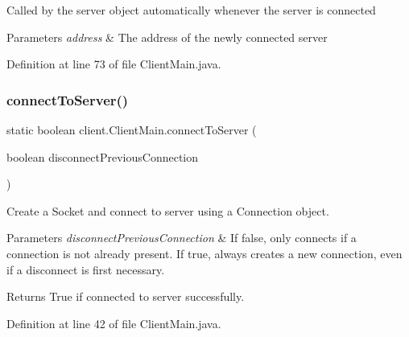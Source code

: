 Called by the {\ttfamily server} object automatically whenever the server is connected


\begin{DoxyParams}{Parameters}
{\em address} & The address of the newly connected server \\
\hline
\end{DoxyParams}


Definition at line 73 of file Client\+Main.\+java.

\hypertarget{classclient_1_1_client_main_aecd59c193bdb0536d649be78f72149b0}{}\label{classclient_1_1_client_main_aecd59c193bdb0536d649be78f72149b0} 
\subsubsection{\texorpdfstring{connect\+To\+Server()}{connectToServer()}}
{\footnotesize\ttfamily static boolean client.\+Client\+Main.\+connect\+To\+Server (\begin{DoxyParamCaption}\item[{boolean}]{disconnect\+Previous\+Connection }\end{DoxyParamCaption})\hspace{0.3cm}{\ttfamily [static]}}

Create a {\ttfamily Socket} and connect to server using a {\ttfamily Connection} object.


\begin{DoxyParams}{Parameters}
{\em disconnect\+Previous\+Connection} & If false, only connects if a connection is not already present. If true, always creates a new connection, even if a disconnect is first necessary. \\
\hline
\end{DoxyParams}
\begin{DoxyReturn}{Returns}
True if connected to server successfully. 
\end{DoxyReturn}


Definition at line 42 of file Client\+Main.\+java.

\hypertarget{classclient_1_1_client_main_a824ffde5fd1b48d4a6ec25a9b00c3dc5}{}\label{classclient_1_1_client_main_a824ffde5fd1b48d4a6ec25a9b00c3dc5} 
